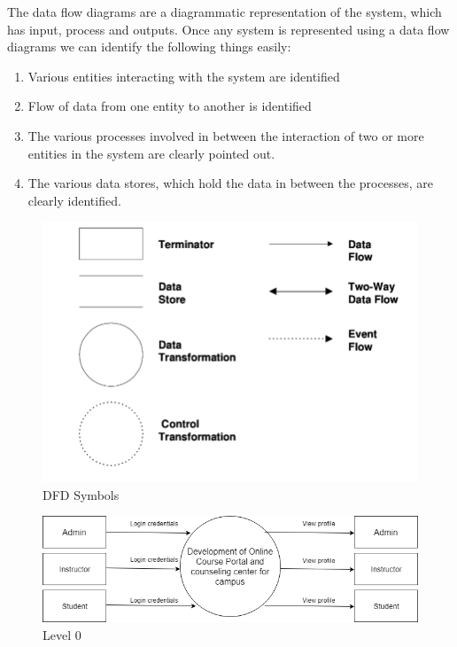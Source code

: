 The data flow diagrams are a diagrammatic representation of the system, which has input, process and outputs. Once any system is represented using a data flow diagrams we can identify the following things easily: 
\begin{enumerate}
\item Various entities interacting with the system are identified
\item Flow of data from one entity to another is identified
\item The various processes involved in between the interaction of two or more entities in the system are clearly pointed out.  
\item The various data stores, which hold the data in between the processes, are clearly identified.
\end{enumerate}

\begin{figure}[!h]
	\begin{center}
		\includegraphics[width=12cm]{DFD_Symbols}
	\end{center}
\caption{DFD Symbols}
\end{figure}


\begin{figure}
  \includegraphics[width=\linewidth]{DFDlevel0.png}
  \caption{ Level 0}
  \label{fig1:Data Flow Diagram Level 0}
\end{figure}

